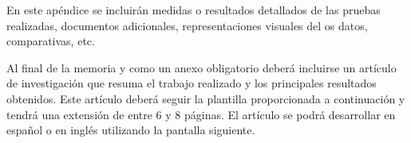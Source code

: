 
En este apéndice se incluirán medidas o resultados detallados de las pruebas realizadas, documentos adicionales, representaciones visuales del os datos, comparativas, etc.


Al final de la memoria y como un anexo obligatorio deberá incluirse un artículo de investigación que resuma el trabajo realizado y los principales resultados obtenidos. Este artículo deberá seguir la plantilla proporcionada a continuación y tendrá una extensión de entre 6 y 8 páginas. El artículo se podrá desarrollar en español o en inglés utilizando la pantalla siguiente.